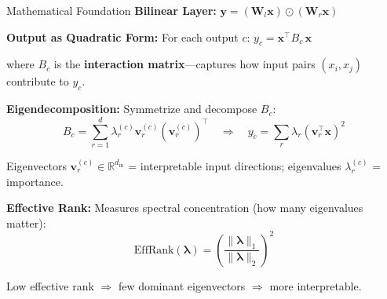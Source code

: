 \begin{frame}{Mathematical Foundation}
    \small
    \textbf{Bilinear Layer:} $\mathbf{y} = (\mathbf{W}_l \mathbf{x}) \odot (\mathbf{W}_r \mathbf{x})$
    
    \vspace{0.15cm}
    \textbf{Output as Quadratic Form:} For each output $c$: \quad $y_c = \mathbf{x}^\top B_c \, \mathbf{x}$
    
    \vspace{0.05cm}
    where $B_c$ is the \textbf{interaction matrix}---captures how input pairs $(x_i, x_j)$ contribute to $y_c$.
    
    \vspace{0.15cm}
    \textbf{Eigendecomposition:} Symmetrize and decompose $B_c$:
    \begin{equation*}
        B_c = \sum_{r=1}^{d} \lambda_r^{(c)} \mathbf{v}_r^{(c)} (\mathbf{v}_r^{(c)})^\top
        \quad \Rightarrow \quad
        y_c = \sum_r \lambda_r (\mathbf{v}_r^\top \mathbf{x})^2
    \end{equation*}
    
    \vspace{-0.1cm}
    \footnotesize
    Eigenvectors $\mathbf{v}_r^{(c)} \in \mathbb{R}^{d_{\text{in}}}$ = interpretable input directions; eigenvalues $\lambda_r^{(c)}$ = importance.
    
    \vspace{0.15cm}
    \small
    \textbf{Effective Rank:} Measures spectral concentration (how many eigenvalues matter):
    \begin{equation*}
        \text{EffRank}(\boldsymbol{\lambda}) = \left( \frac{\|\boldsymbol{\lambda}\|_1}{\|\boldsymbol{\lambda}\|_2} \right)^2
    \end{equation*}
    
    \vspace{-0.15cm}
    \footnotesize
    Low effective rank $\Rightarrow$ few dominant eigenvectors $\Rightarrow$ more interpretable.
\end{frame}

